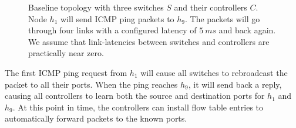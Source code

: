 \begin{figure}[ht]
  \centering
  \caption{Baseline topology with three switches $S$ and their controllers
           $C$. Node $h_1$ will send ICMP ping packets to $h_9$.
           The packets will go through four links with a configured
           latency of $5~ms$ and back again.
           We assume that link-latencies between switches and
           controllers are practically near zero.}
  \label{figure:baseline.topology}
\end{figure}

The first ICMP ping request from $h_1$ will cause all switches to
rebroadcast the packet to all their ports.  When the ping reaches $h_9$,
it will send back a reply, causing all controllers to learn both
the source and destination ports for $h_1$ and $h_9$.
At this point in time, the controllers can install flow table entries to
automatically forward packets to the known ports.

